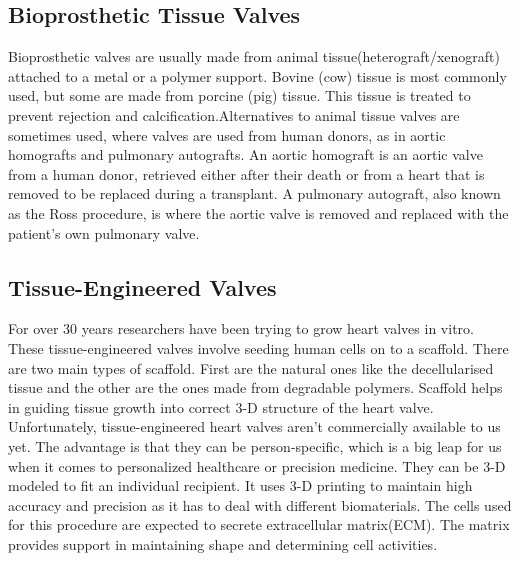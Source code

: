 \documentclass[12pt]{article}
\begin{document}
\begin{normalsize}
\subsection{Bioprosthetic Tissue Valves}
Bioprosthetic valves are usually made from animal tissue(heterograft/xenograft) attached to a metal or a polymer support. Bovine (cow) tissue is most commonly used, but some are made from porcine (pig) tissue. This tissue is treated to prevent rejection and calcification.Alternatives to animal tissue valves are sometimes used, where valves are used from human donors, as in aortic homografts and pulmonary autografts. An aortic homograft is an aortic valve from a human donor, retrieved either after their death or from a heart that is removed to be replaced during a transplant. A pulmonary autograft, also known as the Ross procedure, is where the aortic valve is removed and replaced with the patient's own pulmonary valve.

\subsection{Tissue-Engineered Valves}
For over 30 years researchers have been trying to grow heart valves in vitro. These tissue-engineered valves involve seeding human cells on to a scaffold. There are two main types of scaffold. First are the natural ones like the decellularised tissue and the other are the ones made from degradable polymers. Scaffold helps in guiding tissue growth into correct 3-D structure of the heart valve. Unfortunately, tissue-engineered heart valves aren't commercially available to us yet.
\linebreak
\linebreak
The advantage is that they can be person-specific, which is a big leap for us when it comes to personalized healthcare or precision medicine. They can be 3-D modeled to fit an individual recipient. It uses 3-D printing to maintain high accuracy and precision as it has to deal with different biomaterials. The cells used for this procedure are expected to secrete extracellular matrix(ECM). The matrix provides support in maintaining shape and determining cell activities.


\end{normalsize}
\end{document}
